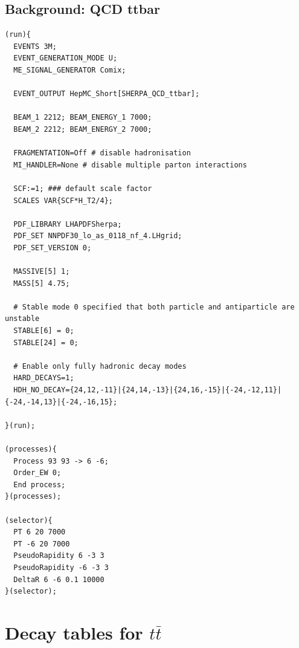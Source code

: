 \documentclass[12pt]{article}
\begin{document}
\subsection {Background: QCD ttbar}
\begin{verbatim}
(run){
  EVENTS 3M;
  EVENT_GENERATION_MODE U;
  ME_SIGNAL_GENERATOR Comix;

  EVENT_OUTPUT HepMC_Short[SHERPA_QCD_ttbar];

  BEAM_1 2212; BEAM_ENERGY_1 7000;
  BEAM_2 2212; BEAM_ENERGY_2 7000;

  FRAGMENTATION=Off # disable hadronisation
  MI_HANDLER=None # disable multiple parton interactions

  SCF:=1; ### default scale factor
  SCALES VAR{SCF*H_T2/4};

  PDF_LIBRARY LHAPDFSherpa;
  PDF_SET NNPDF30_lo_as_0118_nf_4.LHgrid;
  PDF_SET_VERSION 0;

  MASSIVE[5] 1;
  MASS[5] 4.75;

  # Stable mode 0 specified that both particle and antiparticle are unstable
  STABLE[6] = 0;
  STABLE[24] = 0; 

  # Enable only fully hadronic decay modes
  HARD_DECAYS=1;   
  HDH_NO_DECAY={24,12,-11}|{24,14,-13}|{24,16,-15}|{-24,-12,11}|{-24,-14,13}|{-24,-16,15};

}(run);

(processes){
  Process 93 93 -> 6 -6;
  Order_EW 0;
  End process;
}(processes);

(selector){
  PT 6 20 7000
  PT -6 20 7000
  PseudoRapidity 6 -3 3
  PseudoRapidity -6 -3 3
  DeltaR 6 -6 0.1 10000
}(selector);
\end{verbatim}

\clearpage
\section{Decay tables for $t\bar{t}$}
\end{document}
